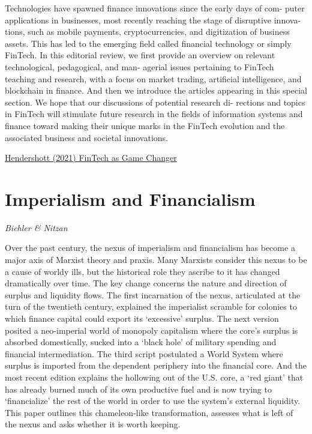 \documentclass[
]{book}
\begin{document}
Technologies have spawned finance innovations since the early days of com-
puter applications in businesses, most recently reaching the stage of disruptive innova-
tions, such as mobile payments, cryptocurrencies, and digitization of business assets. This
has led to the emerging field called financial technology or simply FinTech. In this editorial
review, we first provide an overview on relevant technological, pedagogical, and man-
agerial issues pertaining to FinTech teaching and research, with a focus on market trading,
artificial intelligence, and blockchain in finance. And then we introduce the articles
appearing in this special section. We hope that our discussions of potential research di-
rections and topics in FinTech will stimulate future research in the fields of information
systems and finance toward making their unique marks in the FinTech evolution and the
associated business and societal innovations.

\href{pdf/Hendershott_2021_FinTech_as_Game_Changer.pdf}{Hendershott (2021) FinTech as Game Changer}

\hypertarget{imperialism-and-financialism-1}{%
\chapter{Imperialism and Financialism}\label{imperialism-and-financialism-1}}

\emph{Bichler \& Nitzan}

Over the past century, the nexus of imperialism and financialism has become a major axis
of Marxist theory and praxis. Many Marxists consider this nexus to be a cause of worldy
ills, but the historical role they ascribe to it has changed dramatically over time. The key
change concerns the nature and direction of surplus and liquidity flows. The first
incarnation of the nexus, articulated at the turn of the twentieth century, explained the
imperialist scramble for colonies to which finance capital could export its `excessive'
surplus. The next version posited a neo-imperial world of monopoly capitalism where the
core's surplus is absorbed domestically, sucked into a `black hole' of military spending
and financial intermediation. The third script postulated a World System where surplus is
imported from the dependent periphery into the financial core. And the most recent
edition explains the hollowing out of the U.S. core, a `red giant' that has already burned
much of its own productive fuel and is now trying to `financialize' the rest of the world in
order to use the system's external liquidity. This paper outlines this chameleon-like
transformation, assesses what is left of the nexus and asks whether it is worth keeping.
\end{document}
